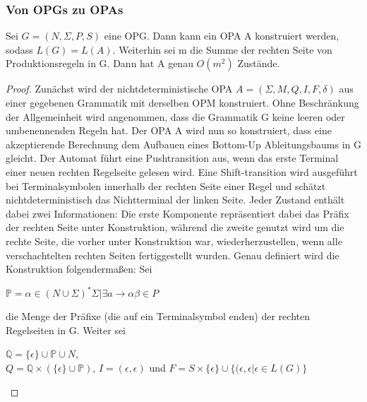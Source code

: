 \subsubsection{Von OPGs zu OPAs}
\label{opgopa}
\begin{lemma}
Sei $G=(N,\Sigma, P, S)$ eine OPG. Dann kann ein OPA A konstruiert werden, sodass $L(G)=L(A)$. Weiterhin sei m die Summe der rechten Seite von Produktionsregeln in G. Dann hat A genau $O(m^2)$ Zustände.
\end{lemma}
\begin{proof}
Zunächst wird der nichtdeterministische OPA $A=(\Sigma, M, Q, I,F, \delta)$ aus einer gegebenen Grammatik mit derselben OPM konstruiert.
Ohne Beschränkung der Allgemeinheit wird angenommen, dass die Grammatik G keine leeren oder umbenennenden Regeln hat. Der OPA A wird nun so konstruiert, dass eine akzeptierende Berechnung dem Aufbauen eines Bottom-Up Ableitungsbaums in G gleicht. Der Automat führt eine Pushtransition aus, wenn das erste Terminal einer neuen rechten Regelseite gelesen wird. Eine Shift-transition  wird ausgeführt bei Terminalsymbolen innerhalb der rechten Seite einer Regel und schätzt nichtdeterministisch das Nichtterminal der linken Seite. Jeder Zustand enthält dabei zwei Informationen: Die erste Komponente repräsentiert dabei das Präfix der rechten Seite unter Konstruktion, während die zweite genutzt wird um die rechte Seite, die vorher unter Konstruktion war, wiederherzustellen, wenn alle verschachtelten rechten Seiten fertiggestellt wurden.
Genau definiert wird die Konstruktion folgendermaßen: Sei 
\begin{center}
$\mathbb{P}={\alpha\in (N\cup\Sigma)^*\Sigma|\exists a\rightarrow\alpha\beta\in P}$
\end{center}
die Menge der Präfixe (die auf ein Terminalsymbol enden) der rechten Regelseiten in G. Weiter sei
\begin{center}
$\mathbb{Q}=\{\epsilon\}\cup\mathbb{P}\cup N$,\\
$Q=\mathbb{Q} \times (\{\epsilon\} \cup \mathbb{P})$, $I={(\epsilon, \epsilon)}$ und $F=S\times \{\epsilon\} \cup \{(\epsilon, \epsilon|\epsilon\in L(G)\}$
\end{center}


\end{proof}
